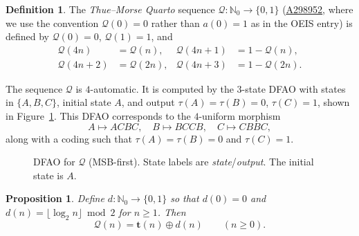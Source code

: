 \documentclass[12pt,reqno]{article}
\newcommand{\seqnum}[1]{\href{https://oeis.org/#1}{\rm \underline{#1}}}
\theoremstyle{plain}
\newtheorem{proposition}[theorem]{Proposition}
\theoremstyle{definition}
\newtheorem{definition}[theorem]{Definition}
\theoremstyle{remark}
\begin{document}
\begin{definition}
The \emph{Thue--Morse Quarto} sequence $\mathcal{Q}:\mathbb{N}_0\to\{0,1\}$ (\seqnum{A298952}, 
 where we use the convention $\mathcal{Q}(0)=0$ rather than $a(0)=1$ as in the OEIS entry) is 
 defined by $\mathcal{Q}(0)=0$, $\mathcal{Q}(1)=1$, and
\begin{align*}
\mathcal{Q}(4n) &= \mathcal{Q}(n), & \mathcal{Q}(4n+1) &= 1-\mathcal{Q}(n), \\
\mathcal{Q}(4n+2) &= \mathcal{Q}(2n), & \mathcal{Q}(4n+3) &= 1-\mathcal{Q}(2n). 
\end{align*}
\end{definition}

 The sequence $\mathcal{Q}$ is $4$-automatic. It is computed by the $3$-state DFAO with states in $\{A, B, C\}$, initial state $A$, and 
 output $\tau(A)=\tau(B)=0$, $\tau(C)=1$, shown in
 Figure~\ref{fig:Q-dfao}. This DFAO corresponds to the $4$-uniform morphism
$$ A\mapsto ACBC,\quad B\mapsto BCCB,\quad C\mapsto CBBC, $$
 along with a coding such that $\tau(A)=\tau(B)=0$ and $\tau(C)=1$.

\begin{figure}[ht]
\centering
{}
\caption{DFAO for $\mathcal{Q}$ (MSB-first). State labels 
 are \emph{state}/\emph{output}. The initial state is $A$.}\label{fig:Q-dfao} 
\end{figure}

\begin{proposition}\label{prop:Q-rep} 
 Define $d: \mathbb{N}_0\to\{0,1\}$ so that $d(0)=0$ and $d(n) = \lfloor \log_2 n \rfloor \bmod 2$ for $n \geq 1$. 
 Then $$ \mathcal{Q}(n) = \mathbf{t}(n) \oplus d(n) \qquad (n \geq 0). $$
\end{proposition}
\end{document}
